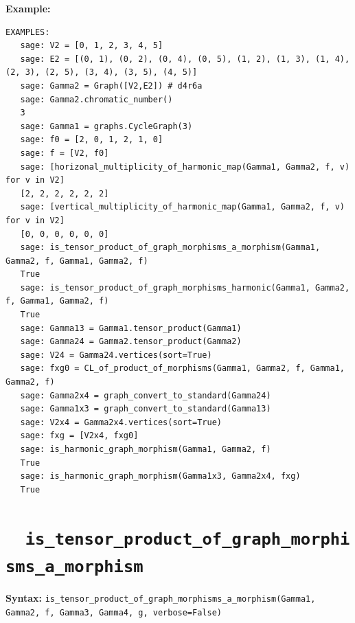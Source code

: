 \documentclass{article}
\begin{document}
\textbf{Example:}
\begin{verbatim}
EXAMPLES:
   sage: V2 = [0, 1, 2, 3, 4, 5]                                                      
   sage: E2 = [(0, 1), (0, 2), (0, 4), (0, 5), (1, 2), (1, 3), (1, 4), (2, 3), (2, 5), (3, 4), (3, 5), (4, 5)] 
   sage: Gamma2 = Graph([V2,E2]) # d4r6a                                         
   sage: Gamma2.chromatic_number()                                              
   3
   sage: Gamma1 = graphs.CycleGraph(3)                                            
   sage: f0 = [2, 0, 1, 2, 1, 0]                                                  
   sage: f = [V2, f0]   
   sage: [horizonal_multiplicity_of_harmonic_map(Gamma1, Gamma2, f, v) for v in V2]     
   [2, 2, 2, 2, 2, 2]
   sage: [vertical_multiplicity_of_harmonic_map(Gamma1, Gamma2, f, v) for v in V2]      
   [0, 0, 0, 0, 0, 0]                                                                 
   sage: is_tensor_product_of_graph_morphisms_a_morphism(Gamma1, Gamma2, f, Gamma1, Gamma2, f) 
   True
   sage: is_tensor_product_of_graph_morphisms_harmonic(Gamma1, Gamma2, f, Gamma1, Gamma2, f)   
   True
   sage: Gamma13 = Gamma1.tensor_product(Gamma1)                                             
   sage: Gamma24 = Gamma2.tensor_product(Gamma2)                                        
   sage: V24 = Gamma24.vertices(sort=True)                                                       
   sage: fxg0 = CL_of_product_of_morphisms(Gamma1, Gamma2, f, Gamma1, Gamma2, f)                
   sage: Gamma2x4 = graph_convert_to_standard(Gamma24)                                          
   sage: Gamma1x3 = graph_convert_to_standard(Gamma13)                              
   sage: V2x4 = Gamma2x4.vertices(sort=True)                                           
   sage: fxg = [V2x4, fxg0]                                                                      
   sage: is_harmonic_graph_morphism(Gamma1, Gamma2, f)                                           
   True
   sage: is_harmonic_graph_morphism(Gamma1x3, Gamma2x4, fxg)                        
   True
\end{verbatim}

\section{\tt \ \ is\_tensor\_product\_of\_graph\_morphisms\_a\_morphism}

\textbf{Syntax:}
{\small{
\verb}is_tensor_product_of_graph_morphisms_a_morphism(Gamma1, Gamma2, f, Gamma3, Gamma4, g, verbose=False)}\\
}}
\end{document}
